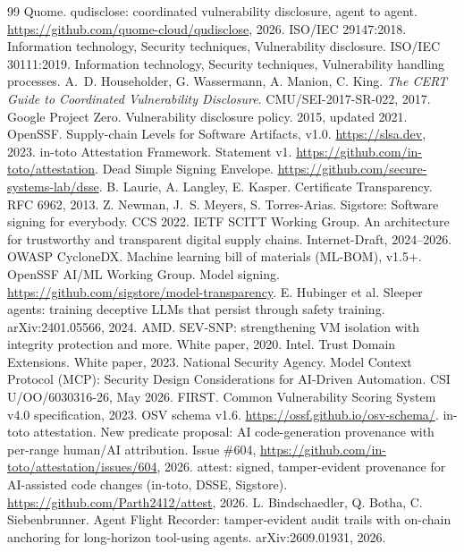 \documentclass[11pt]{article}
\begin{document}
\begin{thebibliography}{99}\small
{} Quome. qudisclose: coordinated vulnerability disclosure, agent to agent. \url{https://github.com/quome-cloud/qudisclose}, 2026.
 ISO/IEC 29147:2018. Information technology, Security techniques, Vulnerability disclosure.
 ISO/IEC 30111:2019. Information technology, Security techniques, Vulnerability handling processes.
 A.~D. Householder, G. Wassermann, A. Manion, C. King. \emph{The CERT Guide to Coordinated Vulnerability Disclosure}. CMU/SEI-2017-SR-022, 2017.
 Google Project Zero. Vulnerability disclosure policy. 2015, updated 2021.
 OpenSSF. Supply-chain Levels for Software Artifacts, v1.0. \url{https://slsa.dev}, 2023.
 in-toto Attestation Framework. Statement v1. \url{https://github.com/in-toto/attestation}.
 Dead Simple Signing Envelope. \url{https://github.com/secure-systems-lab/dsse}.
 B. Laurie, A. Langley, E. Kasper. Certificate Transparency. RFC 6962, 2013.
 Z. Newman, J.~S. Meyers, S. Torres-Arias. Sigstore: Software signing for everybody. CCS 2022.
 IETF SCITT Working Group. An architecture for trustworthy and transparent digital supply chains. Internet-Draft, 2024--2026.
 OWASP CycloneDX. Machine learning bill of materials (ML-BOM), v1.5+.
 OpenSSF AI/ML Working Group. Model signing. \url{https://github.com/sigstore/model-transparency}.
 E. Hubinger et al. Sleeper agents: training deceptive LLMs that persist through safety training. arXiv:2401.05566, 2024.
 AMD. SEV-SNP: strengthening VM isolation with integrity protection and more. White paper, 2020.
 Intel. Trust Domain Extensions. White paper, 2023.
 National Security Agency. Model Context Protocol (MCP): Security Design Considerations for AI-Driven Automation. CSI U/OO/6030316-26, May 2026.
 FIRST. Common Vulnerability Scoring System v4.0 specification, 2023.
 OSV schema v1.6. \url{https://ossf.github.io/osv-schema/}.
 in-toto attestation. New predicate proposal: AI code-generation provenance with per-range human/AI attribution. Issue \#604, \url{https://github.com/in-toto/attestation/issues/604}, 2026.
 attest: signed, tamper-evident provenance for AI-assisted code changes (in-toto, DSSE, Sigstore). \url{https://github.com/Parth2412/attest}, 2026.
 L. Bindschaedler, Q. Botha, C. Siebenbrunner. Agent Flight Recorder: tamper-evident audit trails with on-chain anchoring for long-horizon tool-using agents. arXiv:2609.01931, 2026.

\end{thebibliography}
\end{document}
